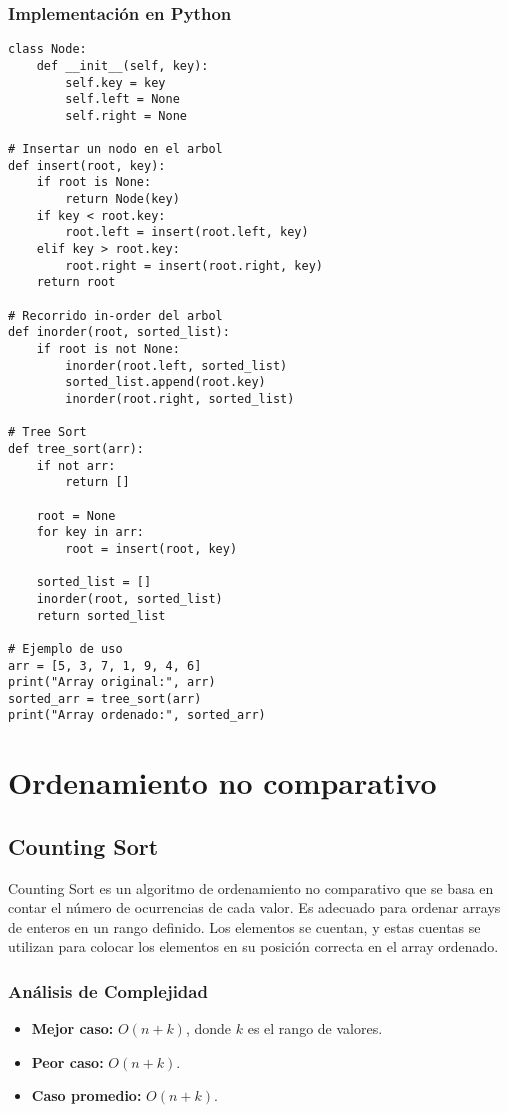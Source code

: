 \documentclass[11pt,openany]{book}
\begin{document}
\subsubsection{Implementación en Python}
\lstset{language=Python}
\begin{lstlisting}
class Node:
    def __init__(self, key):
        self.key = key
        self.left = None
        self.right = None

# Insertar un nodo en el arbol
def insert(root, key):
    if root is None:
        return Node(key)
    if key < root.key:
        root.left = insert(root.left, key)
    elif key > root.key:
        root.right = insert(root.right, key)
    return root

# Recorrido in-order del arbol
def inorder(root, sorted_list):
    if root is not None:
        inorder(root.left, sorted_list)
        sorted_list.append(root.key)
        inorder(root.right, sorted_list)

# Tree Sort
def tree_sort(arr):
    if not arr:
        return []

    root = None
    for key in arr:
        root = insert(root, key)

    sorted_list = []
    inorder(root, sorted_list)
    return sorted_list

# Ejemplo de uso
arr = [5, 3, 7, 1, 9, 4, 6]
print("Array original:", arr)
sorted_arr = tree_sort(arr)
print("Array ordenado:", sorted_arr)
\end{lstlisting}

\section{Ordenamiento no comparativo}
\subsection{Counting Sort}
Counting Sort es un algoritmo de ordenamiento no comparativo que se basa en contar el número de ocurrencias de cada valor. Es adecuado para ordenar arrays de enteros en un rango definido. Los elementos se cuentan, y estas cuentas se utilizan para colocar los elementos en su posición correcta en el array ordenado.

\subsubsection{Análisis de Complejidad}
\begin{itemize}
    \item \textbf{Mejor caso:} $O(n + k)$, donde $k$ es el rango de valores.
    \item \textbf{Peor caso:} $O(n + k)$.
    \item \textbf{Caso promedio:} $O(n + k)$.
\end{itemize}
\end{document}
